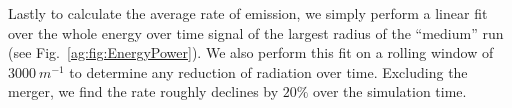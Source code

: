 Lastly to calculate the average rate of emission, we simply perform a linear fit over the whole energy over time signal of the largest radius of the ``medium'' run (see Fig.~\ref{ag:fig:EnergyPower}). We also perform this fit on a rolling window of $3000~m^{-1}$ to determine any reduction of radiation over time. Excluding the merger, we find the rate roughly declines by $20 \%$ over the simulation time.
